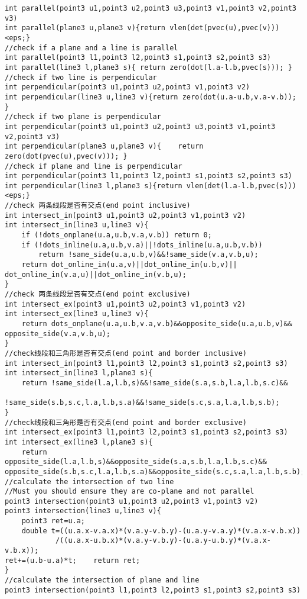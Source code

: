 \begin{lstlisting}
int parallel(point3 u1,point3 u2,point3 u3,point3 v1,point3 v2,point3 v3)
int parallel(plane3 u,plane3 v){return vlen(det(pvec(u),pvec(v)))<eps;}
//check if a plane and a line is parallel
int parallel(point3 l1,point3 l2,point3 s1,point3 s2,point3 s3)
int parallel(line3 l,plane3 s){ return zero(dot(l.a-l.b,pvec(s))); }
//check if two line is perpendicular
int perpendicular(point3 u1,point3 u2,point3 v1,point3 v2)
int perpendicular(line3 u,line3 v){return zero(dot(u.a-u.b,v.a-v.b)); }
//check if two plane is perpendicular
int perpendicular(point3 u1,point3 u2,point3 u3,point3 v1,point3 v2,point3 v3)
int perpendicular(plane3 u,plane3 v){    return zero(dot(pvec(u),pvec(v))); }
//check if plane and line is perpendicular
int perpendicular(point3 l1,point3 l2,point3 s1,point3 s2,point3 s3)
int perpendicular(line3 l,plane3 s){return vlen(det(l.a-l.b,pvec(s)))<eps;}
//check 两条线段是否有交点(end point inclusive)
int intersect_in(point3 u1,point3 u2,point3 v1,point3 v2)
int intersect_in(line3 u,line3 v){
    if (!dots_onplane(u.a,u.b,v.a,v.b)) return 0;
    if (!dots_inline(u.a,u.b,v.a)||!dots_inline(u.a,u.b,v.b))
        return !same_side(u.a,u.b,v)&&!same_side(v.a,v.b,u);
    return dot_online_in(u.a,v)||dot_online_in(u.b,v)||
dot_online_in(v.a,u)||dot_online_in(v.b,u);
}
//check 两条线段是否有交点(end point exclusive)
int intersect_ex(point3 u1,point3 u2,point3 v1,point3 v2)
int intersect_ex(line3 u,line3 v){
    return dots_onplane(u.a,u.b,v.a,v.b)&&opposite_side(u.a,u.b,v)&&
opposite_side(v.a,v.b,u);
}
//check线段和三角形是否有交点(end point and border inclusive)
int intersect_in(point3 l1,point3 l2,point3 s1,point3 s2,point3 s3)
int intersect_in(line3 l,plane3 s){
    return !same_side(l.a,l.b,s)&&!same_side(s.a,s.b,l.a,l.b,s.c)&&
        !same_side(s.b,s.c,l.a,l.b,s.a)&&!same_side(s.c,s.a,l.a,l.b,s.b);
}
//check线段和三角形是否有交点(end point and border exclusive)
int intersect_ex(point3 l1,point3 l2,point3 s1,point3 s2,point3 s3)
int intersect_ex(line3 l,plane3 s){
    return opposite_side(l.a,l.b,s)&&opposite_side(s.a,s.b,l.a,l.b,s.c)&&    opposite_side(s.b,s.c,l.a,l.b,s.a)&&opposite_side(s.c,s.a,l.a,l.b,s.b);}
//calculate the intersection of two line
//Must you should ensure they are co-plane and not parallel
point3 intersection(point3 u1,point3 u2,point3 v1,point3 v2)
point3 intersection(line3 u,line3 v){
    point3 ret=u.a; 
    double t=((u.a.x-v.a.x)*(v.a.y-v.b.y)-(u.a.y-v.a.y)*(v.a.x-v.b.x))
            /((u.a.x-u.b.x)*(v.a.y-v.b.y)-(u.a.y-u.b.y)*(v.a.x-v.b.x));
ret+=(u.b-u.a)*t;    return ret;
}
//calculate the intersection of plane and line
point3 intersection(point3 l1,point3 l2,point3 s1,point3 s2,point3 s3)

\end{lstlisting}
